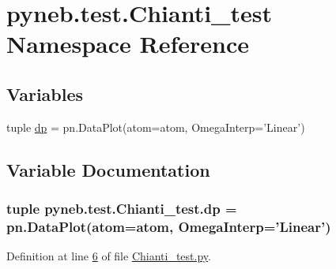 \hypertarget{namespacepyneb_1_1test_1_1_chianti__test}{\section{pyneb.\-test.\-Chianti\-\_\-test Namespace Reference}
\label{namespacepyneb_1_1test_1_1_chianti__test}
}
\subsection*{Variables}
\begin{DoxyCompactItemize}
\item 
tuple \hyperlink{namespacepyneb_1_1test_1_1_chianti__test_a19b19443ce67bd7f26c80fa05c0626ad}{dp} = pn.\-Data\-Plot(atom=atom, Omega\-Interp='Linear')
\end{DoxyCompactItemize}


\subsection{Variable Documentation}
\hypertarget{namespacepyneb_1_1test_1_1_chianti__test_a19b19443ce67bd7f26c80fa05c0626ad}{
\subsubsection[{dp}]{\setlength{\rightskip}{0pt plus 5cm}tuple pyneb.\-test.\-Chianti\-\_\-test.\-dp = pn.\-Data\-Plot(atom=atom, Omega\-Interp='Linear')}}\label{namespacepyneb_1_1test_1_1_chianti__test_a19b19443ce67bd7f26c80fa05c0626ad}


Definition at line \hyperlink{_chianti__test_8py_source_l00006}{6} of file \hyperlink{_chianti__test_8py_source}{Chianti\-\_\-test.\-py}.


